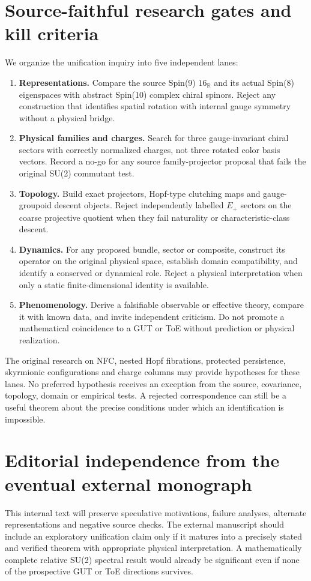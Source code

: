 \section{Source-faithful research gates and kill criteria}
We organize the unification inquiry into five independent lanes:
\begin{enumerate}[leftmargin=*,itemsep=.5em]
\item \textbf{Representations.} Compare the source Spin(9)
$16_{\mathbb R}$ and its actual Spin(8) eigenspaces with abstract
Spin(10) complex chiral spinors. Reject any construction that
identifies spatial rotation with internal gauge symmetry without a
physical bridge.
\item \textbf{Physical families and charges.} Search for
three gauge-invariant chiral sectors with correctly normalized
charges, not three rotated color basis vectors. Record a no-go for
any source family-projector proposal that fails the original SU(2)
commutant test.
\item \textbf{Topology.} Build exact projectors, Hopf-type clutching
maps and gauge-groupoid descent objects. Reject independently labelled
$E_+$ sectors on the coarse projective quotient when they fail
naturality or characteristic-class descent.
\item \textbf{Dynamics.} For any proposed bundle, sector or composite,
construct its operator on the original physical space, establish
domain compatibility, and identify a conserved or dynamical role.
Reject a physical interpretation when only a static finite-dimensional
identity is available.
\item \textbf{Phenomenology.} Derive a falsifiable observable or
effective theory, compare it with known data, and invite independent
criticism. Do not promote a mathematical coincidence to a GUT or ToE
without prediction or physical realization.
\end{enumerate}

The original research on NFC, nested Hopf fibrations, protected
persistence, skyrmionic configurations and charge columns may provide
hypotheses for these lanes. No preferred hypothesis receives an
exception from the source, covariance, topology, domain or empirical
tests. A rejected correspondence can still be a useful theorem
about the precise conditions under which an identification is
impossible.

\section{Editorial independence from the eventual external monograph}
This internal text will preserve speculative motivations, failure
analyses, alternate representations and negative source checks.
The external manuscript should include an exploratory unification
claim only if it matures into a precisely stated and verified theorem
with appropriate physical interpretation. A mathematically complete
relative SU(2) spectral result would already be significant even if
none of the prospective GUT or ToE directions survives.

